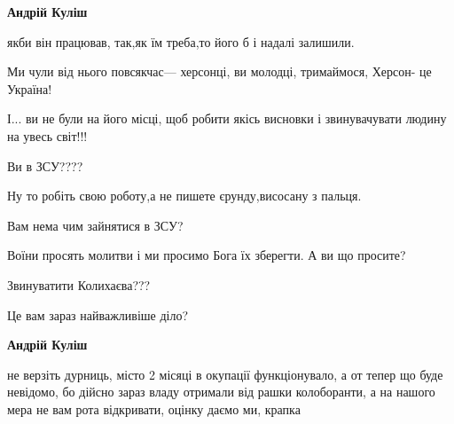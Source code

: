 \begin{itemize}
\begin{itemize}
\textbf{Андрій Куліш} 

якби він працював, так,як їм треба,то його б і надалі залишили.

Ми чули від нього повсякчас--- херсонці, ви молодці, тримаймося, Херсон- це
Україна!

І... ви не були на його місці, щоб робити якісь висновки і звинувачувати людину
на увесь світ!!!

Ви в ЗСУ????

Ну то робіть свою роботу,а не пишете єрунду,висосану з пальця.

Вам нема чим зайнятися в ЗСУ?

Воїни просять молитви і ми просимо Бога їх зберегти. А ви що просите?

Звинуватити Колихаєва???

Це вам зараз найважливіше діло?

\textbf{Андрій Куліш} 

не верзіть дурниць, місто 2 місяці в окупації функціонувало, а от тепер що буде
невідомо, бо дійсно зараз владу отримали від рашки колоборанти, а на нашого
мера не вам рота відкривати, оцінку даємо ми, крапка

\end{itemize} %




\end{itemize} %
